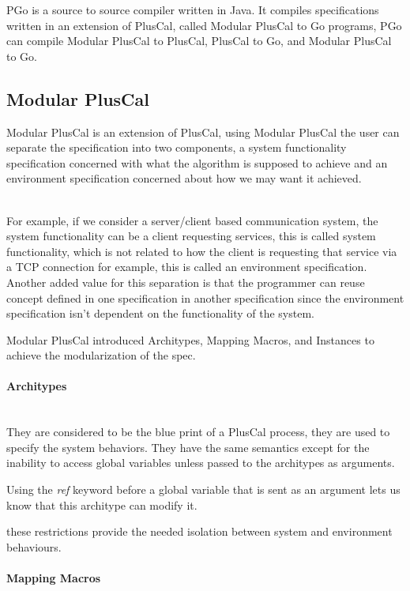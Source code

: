 \documentclass{thesul}
\begin{document}
PGo is a source to source compiler written in Java. It compiles specifications written in an extension of PlusCal, called Modular PlusCal to Go programs, PGo can compile Modular PlusCal to PlusCal, PlusCal to Go, and Modular PlusCal to Go.

\subsection{Modular PlusCal}

Modular PlusCal is an extension of PlusCal, using Modular PlusCal the user can separate the specification into two components, a system functionality specification concerned with what the algorithm is supposed to achieve and an environment specification concerned about how we may want it achieved.

\hfill\\

For example, if we consider a server/client based communication system, the system functionality can be a client requesting services, this is called system functionality, which is not related to how the client is requesting that service via a TCP connection for example, this is called an environment specification. Another added value for this separation is that the programmer can reuse concept defined in one specification in another specification since the environment specification isn't dependent on the functionality of the system.

Modular PlusCal introduced Architypes, Mapping Macros, and Instances to achieve the modularization of the spec.

\paragraph{\textbf{Architypes}}
\hfill\\
They are considered to be the blue print of a PlusCal process, they are used to specify the system behaviors. They have the same semantics except for the inability to access global variables unless passed to the architypes as arguments.

Using the \textit{ref} keyword before a global variable that is sent as an argument lets us know that this architype can modify it.

these restrictions provide the needed isolation between system and environment behaviours.

\paragraph{Mapping Macros}
\end{document}

